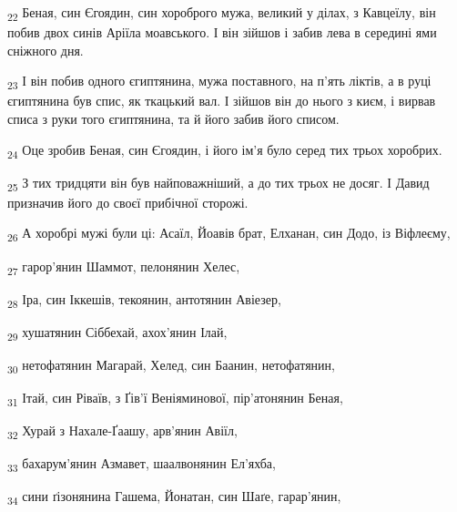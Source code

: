 \begin{tcolorbox}
\textsubscript{22} Беная, син Єгоядин, син хороброго мужа, великий у ділах, з Кавцеїлу, він побив двох синів Аріїла моавського. І він зійшов і забив лева в середині ями сніжного дня.
\end{tcolorbox}
\begin{tcolorbox}
\textsubscript{23} І він побив одного єгиптянина, мужа поставного, на п'ять ліктів, а в руці єгиптянина був спис, як ткацький вал. І зійшов він до нього з києм, і вирвав списа з руки того єгиптянина, та й його забив його списом.
\end{tcolorbox}
\begin{tcolorbox}
\textsubscript{24} Оце зробив Беная, син Єгоядин, і його ім'я було серед тих трьох хоробрих.
\end{tcolorbox}
\begin{tcolorbox}
\textsubscript{25} З тих тридцяти він був найповажніший, а до тих трьох не досяг. І Давид призначив його до своєї прибічної сторожі.
\end{tcolorbox}
\begin{tcolorbox}
\textsubscript{26} А хоробрі мужі були ці: Асаїл, Йоавів брат, Елханан, син Додо, із Віфлеєму,
\end{tcolorbox}
\begin{tcolorbox}
\textsubscript{27} гарор'янин Шаммот, пелонянин Хелес,
\end{tcolorbox}
\begin{tcolorbox}
\textsubscript{28} Іра, син Іккешів, текоянин, антотянин Авіезер,
\end{tcolorbox}
\begin{tcolorbox}
\textsubscript{29} хушатянин Сіббехай, ахох'янин Ілай,
\end{tcolorbox}
\begin{tcolorbox}
\textsubscript{30} нетофатянин Магарай, Хелед, син Баанин, нетофатянин,
\end{tcolorbox}
\begin{tcolorbox}
\textsubscript{31} Ітай, син Ріваїв, з Ґів'ї Веніяминової, пір'атонянин Беная,
\end{tcolorbox}
\begin{tcolorbox}
\textsubscript{32} Хурай з Нахале-Ґаашу, арв'янин Авіїл,
\end{tcolorbox}
\begin{tcolorbox}
\textsubscript{33} бахарум'янин Азмавет, шаалвонянин Ел'яхба,
\end{tcolorbox}
\begin{tcolorbox}
\textsubscript{34} сини ґізонянина Гашема, Йонатан, син Шаґе, гарар'янин,
\end{tcolorbox}
